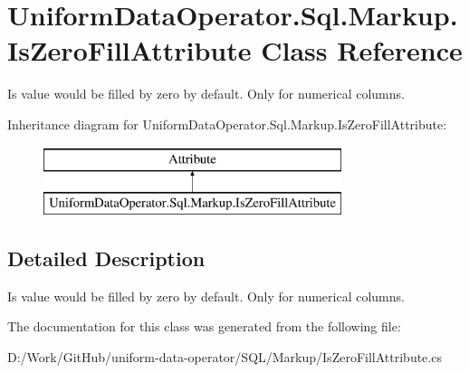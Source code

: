 \hypertarget{class_uniform_data_operator_1_1_sql_1_1_markup_1_1_is_zero_fill_attribute}{}\section{Uniform\+Data\+Operator.\+Sql.\+Markup.\+Is\+Zero\+Fill\+Attribute Class Reference}
\label{class_uniform_data_operator_1_1_sql_1_1_markup_1_1_is_zero_fill_attribute}


Is value would be filled by zero by default. Only for numerical columns.  


Inheritance diagram for Uniform\+Data\+Operator.\+Sql.\+Markup.\+Is\+Zero\+Fill\+Attribute\+:\begin{figure}[H]
\begin{center}
\leavevmode
\includegraphics[height=2.000000cm]{d1/d7c/class_uniform_data_operator_1_1_sql_1_1_markup_1_1_is_zero_fill_attribute}
\end{center}
\end{figure}


\subsection{Detailed Description}
Is value would be filled by zero by default. Only for numerical columns. 



The documentation for this class was generated from the following file\+:\begin{DoxyCompactItemize}
\item 
D\+:/\+Work/\+Git\+Hub/uniform-\/data-\/operator/\+S\+Q\+L/\+Markup/Is\+Zero\+Fill\+Attribute.\+cs\end{DoxyCompactItemize}
